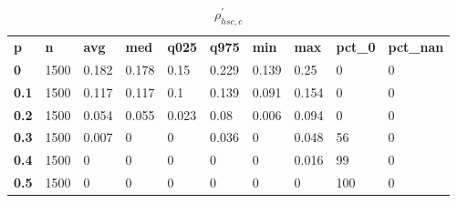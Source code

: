 \begin{table}[h]
 \centering 
\footnotesize
\caption{$\rho_{hsc,c}^\prime $}
\label{tab:alphahscc}
\begin{tabular}[h]{| l l l l l l l l l l|
    } \hline
\textbf{ p} & \textbf{ n} & \textbf{ avg} & \textbf{ med} & \textbf{ q025} & \textbf{ q975} & \textbf{ min} & \textbf{ max} & \textbf{ pct\_0} & \textbf{ pct\_nan}
           \\
  \textbf{  0} & 1500 & 0.182 & 0.178 &  0.15 & 0.229 & 0.139 &  0.25 &   0 & 0
           \\
  \textbf{0.1} & 1500 & 0.117 & 0.117 &   0.1 & 0.139 & 0.091 & 0.154 &   0 & 0
           \\
  \textbf{0.2} & 1500 & 0.054 & 0.055 & 0.023 &  0.08 & 0.006 & 0.094 &   0 & 0
           \\
  \textbf{0.3} & 1500 & 0.007 &     0 &     0 & 0.036 &     0 & 0.048 &  56 & 0
           \\
  \textbf{0.4} & 1500 &     0 &     0 &     0 &     0 &     0 & 0.016 &  99 & 0
           \\
  \textbf{0.5} & 1500 &     0 &     0 &     0 &     0 &     0 &     0 & 100 & 0
           \\
 \hline \end{tabular}
 \end{table}
